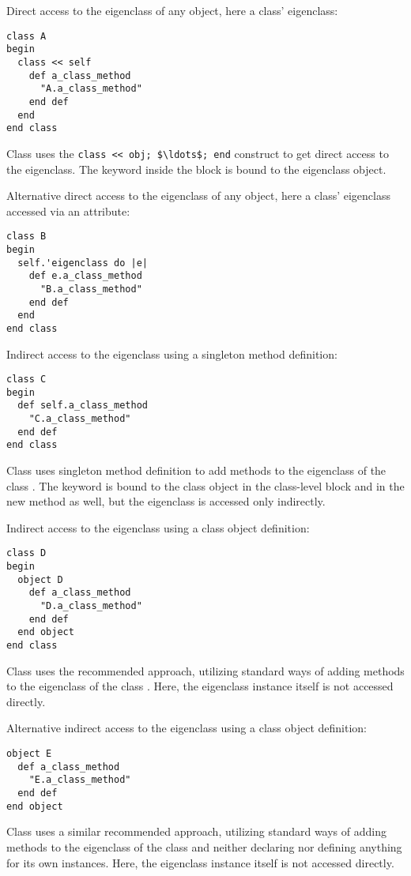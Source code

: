 \example Direct access to the eigenclass of any object, here a class' eigenclass:
\begin{lstlisting}
class A
begin
  class << self
    def a_class_method
      "A.a_class_method"
    end def
  end
end class
\end{lstlisting}
Class  uses the \lstinline!class << obj; $\ldots$; end! construct to get direct access to the eigenclass. The keyword  inside the block is bound to the eigenclass object. 

\example Alternative direct access to the eigenclass of any object, here a class' eigenclass accessed via an attribute:
\begin{lstlisting}
class B
begin
  self.'eigenclass do |e|
    def e.a_class_method
      "B.a_class_method"
    end def
  end
end class
\end{lstlisting} 

\example Indirect access to the eigenclass using a singleton method definition:
\begin{lstlisting}
class C
begin
  def self.a_class_method
    "C.a_class_method"
  end def
end class
\end{lstlisting}
Class  uses singleton method definition to add methods to the eigenclass of the class . The keyword  is bound to the class object in the class-level block and in the new method as well, but the eigenclass is accessed only indirectly. 

\example Indirect access to the eigenclass using a class object definition:
\begin{lstlisting}
class D
begin
  object D
    def a_class_method
      "D.a_class_method"
    end def
  end object
end class
\end{lstlisting}
Class  uses the recommended approach, utilizing standard ways of adding methods to the eigenclass of the class . Here, the eigenclass instance itself is not accessed directly.  

\example Alternative indirect access to the eigenclass using a class object definition:
\begin{lstlisting}
object E
  def a_class_method
    "E.a_class_method"
  end def
end object
\end{lstlisting}
Class  uses a similar recommended approach, utilizing standard ways of adding methods to the eigenclass of the class  and neither declaring nor defining anything for its own instances. Here, the eigenclass instance itself is not accessed directly. 

